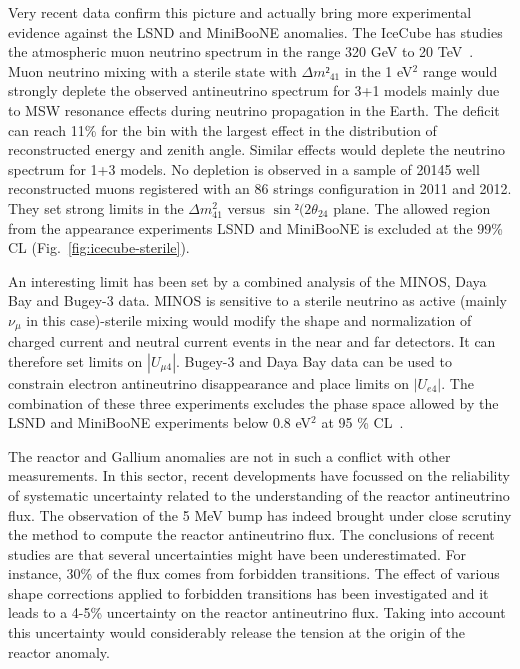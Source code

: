 Very recent data confirm this picture and actually bring more experimental evidence against the LSND and MiniBooNE anomalies.
The IceCube has studies the atmospheric muon neutrino spectrum in the range 320 GeV to 20 TeV~\cite{icecubeste}. Muon neutrino mixing with a sterile state with $\Delta m²_{41}$ in the 1 eV$^2$ range would strongly deplete the observed antineutrino spectrum for 3+1 models mainly due to MSW resonance effects during neutrino propagation in the Earth. The deficit can reach 11\% for the bin with the largest effect in the distribution of reconstructed energy and zenith angle. Similar effects would deplete the neutrino spectrum for 1+3 models. No depletion is observed in a sample of 20145 well reconstructed muons registered with an 86 strings configuration in 2011 and 2012. They set strong limits in the 
$\Delta m^2_{41}$ versus $\sin² (2 \theta_{24}$ plane. The allowed region from the appearance experiments LSND and MiniBooNE is excluded at the 99\% CL (Fig.~\ref{fig:icecube-sterile}).  

An interesting limit has been set by a combined analysis of the MINOS, Daya Bay and Bugey-3 data. MINOS is sensitive to a sterile neutrino as active (mainly $\nu_\mu$ in this case)-sterile mixing would modify the shape and normalization of charged current and neutral current events in the near and far detectors.
It can therefore set limits on $|U_{\mu 4}|$. Bugey-3 and Daya Bay data can be used to constrain electron antineutrino disappearance and place limits on $|U_{e 4}|$. The combination of these three experiments excludes the phase space allowed by the LSND and MiniBooNE experiments below 0.8 eV$^2$ at 95 \% CL~\cite{dayabaycomb}. 

The reactor and Gallium anomalies are not in such a conflict with other measurements. In this sector, recent developments have focussed on the reliability of systematic uncertainty related to the understanding of the reactor antineutrino flux. The observation of the 5 MeV bump has indeed brought under close scrutiny the method to compute the reactor antineutrino flux. The conclusions of recent studies \cite{hayes,vogel} are that several uncertainties might have been underestimated. For instance, 30\% of the flux comes from forbidden transitions. The effect of various shape corrections applied to forbidden transitions has been investigated and it leads to a 4-5\% uncertainty on the reactor antineutrino flux. Taking into account this uncertainty would considerably release the tension at the origin of the reactor anomaly.

